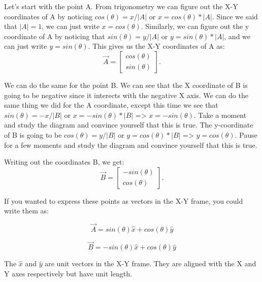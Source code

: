 \documentclass[11pt]{article}
\begin{document}
\noindent

Let's start with the point A.  From trigonometry we can figure out the X-Y coordinates
of A by noticing $cos(\theta) = x / |A|$ or $x = cos(\theta) * |A|$.  Since we said
that $|A| = 1$, we can just write $x = cos(\theta)$.  Similarly, we can figure out
the y coordinate of A by noticing that $sin(\theta) = y / |A|$ or $y = sin(\theta) * |A|$,
and we can just write $y = sin(\theta)$.  This gives us the X-Y
coordinates of A as:
\begin{equation}
    \vec{A} = 
    \begin{bmatrix}
    cos(\theta) \\
    sin(\theta)
    \end{bmatrix}.
\end{equation}

We can do the same for the point B.  We can see that the X coordinate of B is going to be
negative since it interects with the negative X axis.  We can do the same thing we did 
for the A coordinate, except this time we see that $sin(\theta) = -x / |B|$ or 
$x = -sin(\theta) * |B|$ => $x = -sin(\theta)$.  Take a moment and study the
diagram and convince yourself that this is true.  The y-coordinate of B is going to be
$cos(\theta) = y / |B|$ or $y = cos(\theta) * |B|$ => $y = cos(\theta)$.  Pause for a
few moments and study the diagram and convince yourself that this is true.

Writing out the coordinates B, we get:
\begin{equation}
    \vec{B} = 
    \begin{bmatrix}
    -sin(\theta) \\
    cos(\theta)
    \end{bmatrix}.
\end{equation}

If you wanted to express these points as vectors in the X-Y frame, you could write them 
as:

\begin{equation}
    \vec{A} = sin(\theta) \hat{x} + cos(\theta) \hat{y}
\end{equation}

\begin{equation}
    \vec{B} = -sin(\theta) \hat{x} + cos(\theta) \hat{y}
\end{equation}

The $\hat{x}$ and $\hat{y}$ are unit vectors in the X-Y frame.  They are aligned with the
X and Y axes respectively but have unit length.
\end{document}
